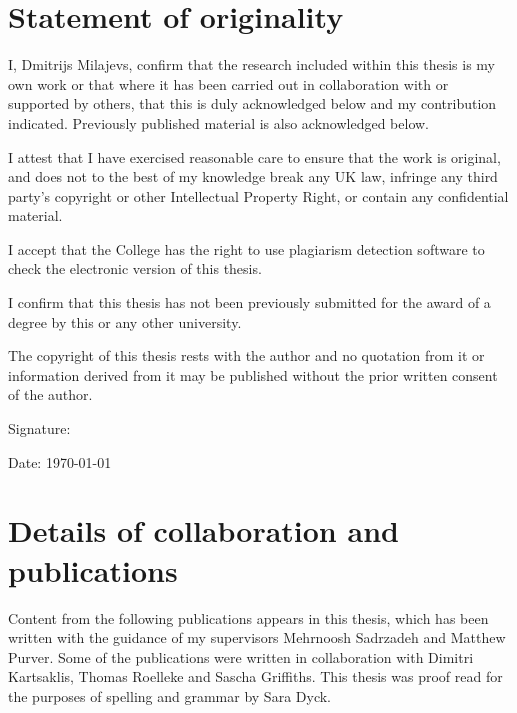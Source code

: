 \chapter*{Statement of originality}

I, Dmitrijs Milajevs, confirm that the research included within this thesis is my own work or that where it has been carried out in collaboration with or supported by others, that this is duly acknowledged below and my contribution indicated. Previously published material is also acknowledged below.

I attest that I have exercised reasonable care to ensure that the work is original, and does not to the best of my knowledge break any UK law, infringe any third party’s copyright or other Intellectual Property Right, or contain any confidential material.

I accept that the College has the right to use plagiarism detection software to check the electronic version of this thesis.

I confirm that this thesis has not been previously submitted for the award of a degree by this or any other university.

The copyright of this thesis rests with the author and no quotation from it or information derived from it may be published without the prior written consent of the author.

Signature:

Date: \today

\chapter*{Details of collaboration and publications}

Content from the following publications appears in this thesis, which has been written with the guidance of my supervisors Mehrnoosh Sadrzadeh and Matthew Purver. Some of the publications were written in collaboration with Dimitri Kartsaklis, Thomas Roelleke and Sascha Griffiths. This thesis was proof read for the purposes of spelling and grammar by Sara Dyck.

